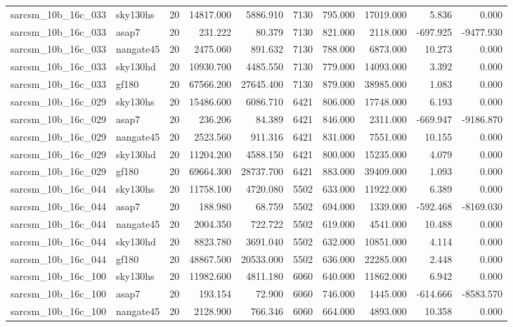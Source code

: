 \documentclass{article}
\begin{document}
\begin{longtable}{llrrrrrrrr}
sarcsm\_10b\_16c\_033 & sky130hs & 20 & 14817.000 & 5886.910 & 7130 & 795.000 & 17019.000 & 5.836 & 0.000 \\
sarcsm\_10b\_16c\_033 & asap7 & 20 & 231.222 & 80.379 & 7130 & 821.000 & 2118.000 & -697.925 & -9477.930 \\
sarcsm\_10b\_16c\_033 & nangate45 & 20 & 2475.060 & 891.632 & 7130 & 788.000 & 6873.000 & 10.273 & 0.000 \\
sarcsm\_10b\_16c\_033 & sky130hd & 20 & 10930.700 & 4485.550 & 7130 & 779.000 & 14093.000 & 3.392 & 0.000 \\
sarcsm\_10b\_16c\_033 & gf180 & 20 & 67566.200 & 27645.400 & 7130 & 879.000 & 38985.000 & 1.083 & 0.000 \\
sarcsm\_10b\_16c\_029 & sky130hs & 20 & 15486.600 & 6086.710 & 6421 & 806.000 & 17748.000 & 6.193 & 0.000 \\
sarcsm\_10b\_16c\_029 & asap7 & 20 & 236.206 & 84.389 & 6421 & 846.000 & 2311.000 & -669.947 & -9186.870 \\
sarcsm\_10b\_16c\_029 & nangate45 & 20 & 2523.560 & 911.316 & 6421 & 831.000 & 7551.000 & 10.155 & 0.000 \\
sarcsm\_10b\_16c\_029 & sky130hd & 20 & 11204.200 & 4588.150 & 6421 & 800.000 & 15235.000 & 4.079 & 0.000 \\
sarcsm\_10b\_16c\_029 & gf180 & 20 & 69664.300 & 28737.700 & 6421 & 883.000 & 39409.000 & 1.093 & 0.000 \\
sarcsm\_10b\_16c\_044 & sky130hs & 20 & 11758.100 & 4720.080 & 5502 & 633.000 & 11922.000 & 6.389 & 0.000 \\
sarcsm\_10b\_16c\_044 & asap7 & 20 & 188.980 & 68.759 & 5502 & 694.000 & 1339.000 & -592.468 & -8169.030 \\
sarcsm\_10b\_16c\_044 & nangate45 & 20 & 2004.350 & 722.722 & 5502 & 619.000 & 4541.000 & 10.488 & 0.000 \\
sarcsm\_10b\_16c\_044 & sky130hd & 20 & 8823.780 & 3691.040 & 5502 & 632.000 & 10851.000 & 4.114 & 0.000 \\
sarcsm\_10b\_16c\_044 & gf180 & 20 & 48867.500 & 20533.000 & 5502 & 636.000 & 22285.000 & 2.448 & 0.000 \\
sarcsm\_10b\_16c\_100 & sky130hs & 20 & 11982.600 & 4811.180 & 6060 & 640.000 & 11862.000 & 6.942 & 0.000 \\
sarcsm\_10b\_16c\_100 & asap7 & 20 & 193.154 & 72.900 & 6060 & 746.000 & 1445.000 & -614.666 & -8583.570 \\
sarcsm\_10b\_16c\_100 & nangate45 & 20 & 2128.900 & 766.346 & 6060 & 664.000 & 4893.000 & 10.358 & 0.000 \\

\end{longtable}
\end{document}

